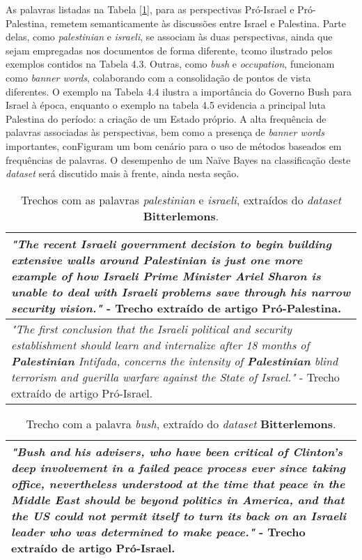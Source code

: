 As palavras listadas na Tabela \ref{1}, para as perspectivas Pró-Israel e Pró-Palestina, remetem semanticamente às discussões entre Israel e Palestina. Parte delas, como \emph{palestinian} e \emph{israeli}, se associam às duas perspectivas, ainda que sejam empregadas nos documentos de forma diferente, tcomo ilustrado pelos exemplos contidos na Tabela 4.3. Outras, como \emph{bush} e \emph{occupation}, funcionam como \emph{banner words}, colaborando com a consolidação de pontos de vista diferentes. O exemplo na Tabela 4.4 ilustra a importância do Governo Bush para Israel à época, enquanto o exemplo na tabela 4.5 evidencia a principal luta Palestina do período: a criação de um Estado próprio. A alta frequência de palavras associadas às perspectivas, bem como a presença de \emph{banner words} importantes, conFiguram um bom cenário para o uso de métodos baseados em frequências de palavras. O desempenho de um Naïve Bayes na classificação deste \emph{dataset} será discutido mais à frente, ainda nesta seção.

\begin{table}[t]
\centering
\begin{tabular}{| p{10cm} | }
\hline

\emph{"The recent \textbf{Israeli} government decision to begin building extensive walls
around \textbf{Palestinian} is just one more example of how \textbf{Israeli} Prime
Minister Ariel Sharon is unable to deal with \textbf{Israeli} problems save
through his narrow security vision."} - Trecho extraído de artigo Pró-Palestina. \\ \hline

\emph{"The first conclusion that the Israeli political and security
establishment should learn and internalize after 18 months of
\textbf{Palestinian} Intifada, concerns the intensity of \textbf{Palestinian} blind
terrorism and guerilla warfare against the State of Israel."} - Trecho extraído de artigo Pró-Israel. \\ \hline

\end{tabular}
\label{3}
\caption{Trechos com as palavras \emph{palestinian} e \emph{israeli}, extraídos do \emph{dataset} \textbf{Bitterlemons}.}
\end{table}

\begin{table}[t]
\centering
\begin{tabular}{| p{10cm} | }
\hline

\emph{"\textbf{Bush}
and his advisers, who have been critical of Clinton's deep involvement
in a failed peace process ever since taking office, nevertheless
understood at the time that peace in the Middle East should be beyond
politics in America, and that the US could not permit itself to turn its
back on an Israeli leader who was determined to make peace."} - Trecho extraído de artigo Pró-Israel. \\ \hline

\end{tabular}
\label{4}
\caption{Trecho com a palavra \emph{bush}, extraído do \emph{dataset} \textbf{Bitterlemons}.}
\end{table}

